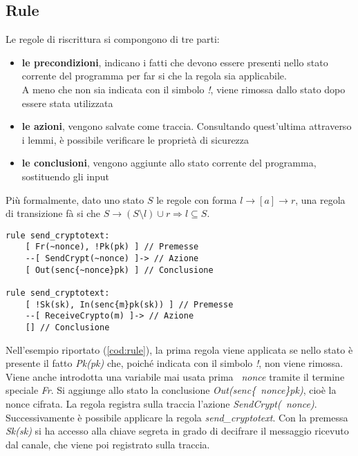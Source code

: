\subsection{Rule}
Le regole di riscrittura si compongono di tre parti:
\begin{itemize}
    \item \textbf{le precondizioni}, indicano i fatti che devono essere presenti nello stato corrente del programma per far si che la regola sia applicabile. \\
          A meno che non sia indicata con il simbolo \textit{!}, viene rimossa dallo stato dopo essere stata utilizzata
    \item \textbf{le azioni}, vengono salvate come traccia. Consultando quest'ultima attraverso i lemmi, è possibile verificare le proprietà di sicurezza
    \item \textbf{le conclusioni}, vengono aggiunte allo stato corrente del programma, sostituendo gli input
\end{itemize}

Più formalmente, dato uno stato $S$ le regole con forma $l \rightarrow [a] \rightarrow r$, una regola di transizione fà si che
$S \rightarrow (S \setminus l ) \cup r \Rightarrow l \subseteq S$.

\begin{lstlisting}[caption=Regole che modellano l'invio e ricezione di un messaggio cifrato. Si assuma che le premesse \textit{Pk(pk)} e \textit{Sk(sk)} siano già presenti nello stato.,
    label=cod:rule]
rule send_cryptotext:
    [ Fr(~nonce), !Pk(pk) ] // Premesse
    --[ SendCrypt(~nonce) ]-> // Azione
    [ Out(senc{~nonce}pk) ] // Conclusione

rule send_cryptotext:
    [ !Sk(sk), In(senc{m}pk(sk)) ] // Premesse
    --[ ReceiveCrypto(m) ]-> // Azione
    [] // Conclusione
\end{lstlisting}

Nell'esempio riportato (\autoref{cod:rule}), la prima regola viene applicata se nello stato è presente il fatto \textit{Pk(pk)} che,
poiché indicata con il simbolo \textit{!}, non viene rimossa. \\
Viene anche introdotta una variabile mai usata prima \textit{~nonce} tramite il termine speciale \textit{Fr}.
Si aggiunge allo stato la conclusione \textit{Out(senc\{~nonce\}pk)}, cioè la nonce cifrata.
La regola registra sulla traccia l'azione \textit{SendCrypt(~nonce)}. \\
Successivamente è possibile applicare la regola \textit{send\_cryptotext}.
Con la premessa \textit{Sk(sk)} si ha accesso alla chiave segreta in grado di decifrare il messaggio ricevuto dal canale,
che viene poi registrato sulla traccia.

